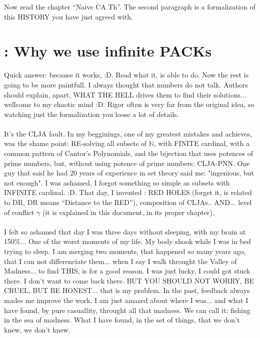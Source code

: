 		\noindent
		Now read the chapter ``Naive CA Th''. The second paragraph is a formalization of this HISTORY you have just agreed with.
		
	\section{\:: Why we use infinite PACKs}
		\noindent
		Quick answer: because it works, :D. Read what it, is able to do. Now the rest is going to be more paintfull. I always thought that numbers do not talk. Authors should explain, apart, WHAT THE HELL drives them to find their solutions... wellcome to my chaotic mind :D. Rigor often is very far from the original idea, so watching just the formalization you loose a lot of details.
		\\\\
		
		\noindent
		It's the CLJA fault. In my begginings, one of my greatest mistakes and achieves, was the shame point: RE-solving all subsets of $\mathbb{N}$, with FINITE cardinal, with a common pattern of Cantor's Polynomials, and the bijection that uses potences of prime numbers, but, without using potence of prime numbers: CLJA-PNN. One guy that said he had 20 years of experience in set theory said me: "ingenious, but not enough". I was ashamed, I forgot something so simple as subsets with INFINITE cardinal. :D. That day, I invented : RED HOLES (forget it, is related to DR, DR means ``Distance to the RED''), composition of CLJAs.. AND... level of conflict $\gamma$ (it is explained in this document, in its proper chapter).
		\\\\
		
		\noindent
		I felt so ashamed that day I was three days without sleeping, with my brain at 150\%... One of the worst moments of my life. My body shook while I was in bed trying to sleep. I am merging two moments, that happened so many years ago, that I can not differenciate them... when I say I walk throught the Valley of Madness... to find THIS, is for a good reason. I was just lucky, I could got stuck there. I don't want to come back there. BUT YOU SHOULD NOT WORRY, BE CRUEL, BUT BE HONEST... that is my problem. In the past, feedback always mades me improve the work. I am just amazed about where I was... and what I have found, by pure casuallity, throught all that madness. We can call it: fishing in the sea of madness. What I have found, in the set of things, that we don't knew, we don't knew.
		\\\\
		
